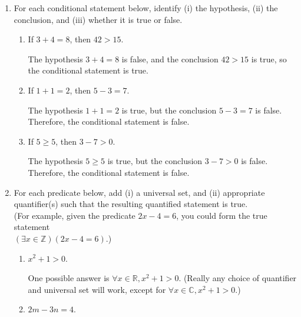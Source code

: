 \documentclass[12pt]{article}
\newcommand{\points}[1]{\marginpar{\hspace{24pt}[#1]}}
\newcommand{\R}{\mathbb{R}}
\begin{document}
\begin{enumerate}
\item For each conditional statement below, identify (i) the hypothesis, (ii) the conclusion, and (iii) whether it is true or false.
\begin{enumerate}
 \item If $3+4=8$, then $42>15$. \points{2}

\medskip

The hypothesis $3+4=8$ is false, and the conclusion $42>15$ is true, so the conditional statement is true.

\vspace{0.5in}

 \item If $1+1=2$, then $5-3=7$. \points{2}

\medskip

The hypothesis $1+1=2$ is true, but the conclusion $5-3=7$ is false. Therefore, the conditional statement is false.

\vspace{0.5in}

 \item If $5\geq 5$, then $3-7>0$. \points{2}

\medskip

The hypothesis $5\geq 5$ is true, but the conclusion $3-7>0$ is false. Therefore, the conditional statement is false.
\end{enumerate}

\vspace{0.5in}

\item For each predicate below, add (i) a universal set, and (ii) appropriate quantifier(s) such that the resulting quantified statement is true.\\
(For example, given the predicate $2x-4=6$, you could form the true statement\\ $(\exists x\in\mathbb{Z})(2x-4=6)$.)

\begin{enumerate}
 \item $x^2+1>0$. \points{2}

\medskip

One possible answer is $\forall x\in\R, x^2+1>0$. (Really any choice of quantifier and universal set will work, except for $\forall x\in\mathbb{C}, x^2+1>0$.)

\vspace{0.5in}

 \item $2m-3n=4$. \points{2}


\end{enumerate}
\end{enumerate}
\end{document}
